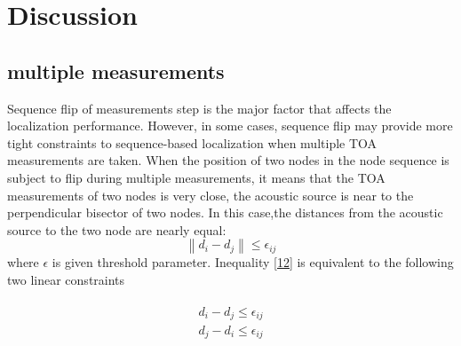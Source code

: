 \section{Discussion}

\subsection{multiple measurements}
 Sequence flip of measurements step is the major factor that affects the localization performance.
 However, in some cases, sequence flip may provide more tight constraints to sequence-based localization when multiple TOA measurements are taken. 
 When the position of two nodes in the node sequence is subject to flip during multiple measurements, 
 it means that the TOA measurements of two nodes is very close,  the acoustic source is near to the perpendicular bisector of two nodes.
In this case,the distances from the acoustic source to the two node are nearly equal:
   \begin{equation} \label{12}
 \left\| {d_i - d_j } \right\| \le \epsilon_{ij}
  \end{equation}
 where $\epsilon$ is given threshold parameter. Inequality \eqref{12} is equivalent to the following two linear constraints

 \begin{eqnarray} \label{13}
 \begin{array}{l}
 d_i - d_j \le \epsilon_{ij}  \\
 d_j - d_i \le \epsilon_{ij}  \\
  \end{array}
 \end{eqnarray}







